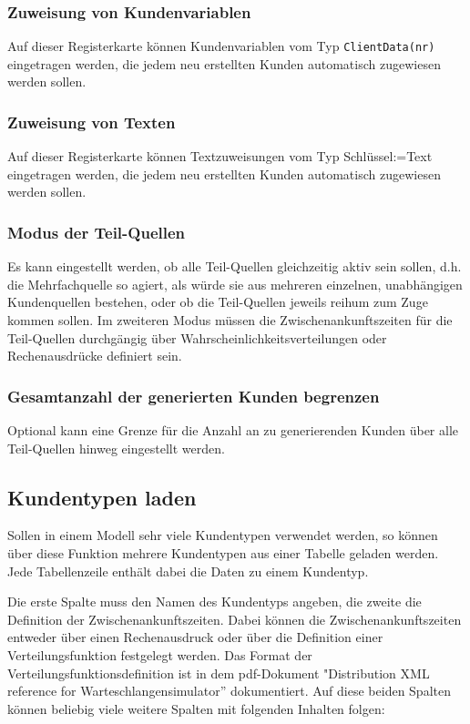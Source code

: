 \subsubsection*{Zuweisung von Kundenvariablen}

Auf dieser Registerkarte können Kundenvariablen vom Typ \texttt{ClientData(nr)} eingetragen werden,
die jedem neu erstellten Kunden automatisch zugewiesen werden sollen.

\subsubsection*{Zuweisung von Texten}

Auf dieser Registerkarte können Textzuweisungen vom Typ Schlüssel:=Text eingetragen werden,
die jedem neu erstellten Kunden automatisch zugewiesen werden sollen.

\subsubsection*{Modus der Teil-Quellen}

Es kann eingestellt werden, ob alle Teil-Quellen gleichzeitig aktiv sein sollen, d.h. die Mehrfachquelle
so agiert, als würde sie aus mehreren einzelnen, unabhängigen Kundenquellen bestehen, oder ob die Teil-Quellen
jeweils reihum zum Zuge kommen sollen. Im zweiteren Modus müssen die Zwischenankunftszeiten für die Teil-Quellen
durchgängig über Wahrscheinlichkeitsverteilungen oder Rechenausdrücke definiert sein.

\subsubsection*{Gesamtanzahl der generierten Kunden begrenzen}

Optional kann eine Grenze für die Anzahl an zu generierenden Kunden über alle Teil-Quellen hinweg
eingestellt werden.

\subsection*{Kundentypen laden}

Sollen in einem Modell sehr viele Kundentypen verwendet werden, so können über diese Funktion mehrere
Kundentypen aus einer Tabelle geladen werden. Jede Tabellenzeile enthält dabei die Daten zu einem Kundentyp.

Die erste Spalte muss den Namen des Kundentyps angeben, die zweite die Definition der Zwischenankunftszeiten.
Dabei können die Zwischenankunftszeiten entweder über einen Rechenausdruck oder über die Definition einer
Verteilungsfunktion festgelegt werden. Das Format der Verteilungsfunktionsdefinition ist in dem pdf-Dokument
"Distribution XML reference for Warteschlangensimulator'' dokumentiert. Auf diese beiden Spalten können beliebig
viele weitere Spalten mit folgenden Inhalten folgen:

